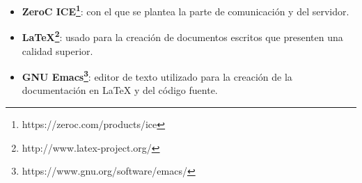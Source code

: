 \documentclass{pre-tfg}
\begin{document}
\begin{itemize}
\begin {itemize}
\end{itemize}
\item \textbf{ZeroC ICE\footnote{https://zeroc.com/products/ice}}: con el que se plantea la parte de comunicación y del servidor. 
\item \textbf{LaTeX\footnote{http://www.latex-project.org/}}: usado para la creación de documentos escritos que presenten una calidad superior.
\item \textbf{GNU Emacs\footnote{https://www.gnu.org/software/emacs/}}: editor de texto utilizado para la creación de la documentación en LaTeX y del código fuente.
\end{itemize}


\singlespacing

\end{document}
